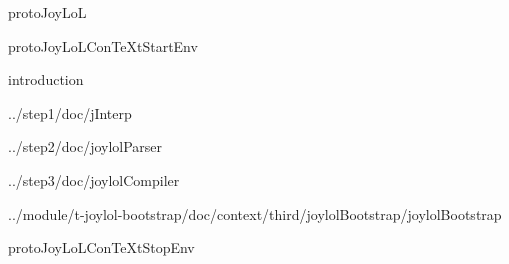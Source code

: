 
\usemodule[t-diSimp]

\startDiSimpComponent protoJoyLoL

\diSimpEnvironment protoJoyLoLConTeXtStartEnv

\diSimpComponent introduction

\diSimpComponent ../step1/doc/jInterp

\diSimpComponent ../step2/doc/joylolParser

\diSimpComponent ../step3/doc/joylolCompiler

\diSimpComponent ../module/t-joylol-bootstrap/doc/context/third/joylolBootstrap/joylolBootstrap

\diSimpEnvironment protoJoyLoLConTeXtStopEnv

\stopDiSimpComponent
